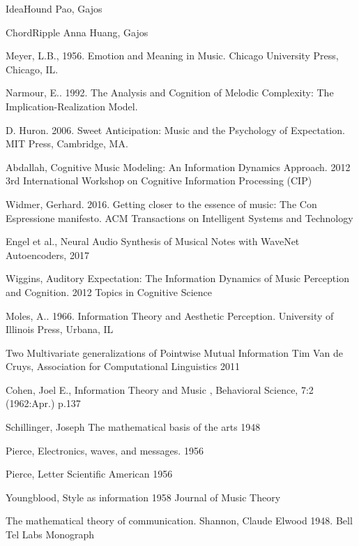 \documentclass[final,authoryear,11pt,times]{elsarticle}
\begin{document}
IdeaHound Pao, Gajos

ChordRipple Anna Huang, Gajos

Meyer, L.B., 1956. Emotion and Meaning in Music. Chicago University Press, Chicago, IL.

Narmour, E.. 1992. The Analysis and Cognition of Melodic Complexity: The Implication-Realization Model.

D. Huron. 2006. Sweet Anticipation: Music and the Psychology of Expectation. MIT Press, Cambridge, MA.

Abdallah, Cognitive Music Modeling: An Information Dynamics Approach. 2012 3rd International Workshop on Cognitive Information Processing (CIP)

Widmer, Gerhard. 2016. Getting closer to the essence of music: The Con Espressione manifesto. ACM Transactions on Intelligent Systems and Technology

Engel et al., Neural Audio Synthesis of Musical Notes with WaveNet Autoencoders, 2017

Wiggins, Auditory Expectation: The Information Dynamics of Music Perception and Cognition. 2012 Topics in Cognitive Science

Moles, A.. 1966. Information Theory and Aesthetic Perception. University of Illinois Press, Urbana, IL

Two Multivariate generalizations of Pointwise Mutual Information Tim Van de Cruys, Association for Computational Linguistics 2011

Cohen, Joel E., Information Theory and Music , Behavioral Science, 7:2 (1962:Apr.) p.137

Schillinger, Joseph The mathematical basis of the arts 1948

Pierce, Electronics, waves, and messages. 1956

Pierce, Letter Scientific American 1956

Youngblood, Style as information 1958 Journal of Music Theory

The mathematical theory of communication. Shannon, Claude Elwood 1948. Bell Tel Labs Monograph



\end{document}
